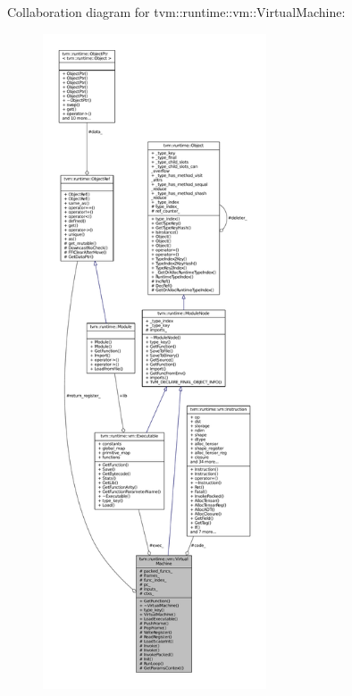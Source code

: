 Collaboration diagram for tvm\+:\+:runtime\+:\+:vm\+:\+:Virtual\+Machine\+:
\nopagebreak
\begin{figure}[H]
\begin{center}
\leavevmode
\includegraphics[height=550pt]{classtvm_1_1runtime_1_1vm_1_1VirtualMachine__coll__graph}
\end{center}
\end{figure}
